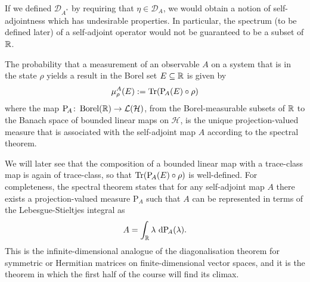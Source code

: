 \begin{remark}
If we defined $\mathcal{D}_{A^*}$ by requiring that $\eta\in \mathcal{D}_{A}$, we would obtain a notion of self-adjointness which has undesirable properties. In particular, the spectrum (to be defined later) of a self-adjoint operator would not be guaranteed to be a subset of $\mathbb{R}$.
\end{remark}

\begin{tcolorbox}[colframe=blue!10!black]
\begin{axiom}[Measurement]
The probability that a measurement of an observable $A$ on a system that is in the state $\rho$ yields a result in the Borel set $E\subseteq \mathbb{R}$ is given by
\begin{equation*}
\mu^A_\rho(E):=\operatorname{Tr}(\mathrm{P}_{\!A}(E)\circ\rho)
\end{equation*}
where the map $\mathrm{P}_{\!A}\colon \operatorname{Borel}(\mathbb{R})\to\mathcal{L}(\mathcal{H})$, from the Borel-measurable subsets of $\mathbb{R}$ to the Banach space of bounded linear maps on $\mathcal{H}$, is the unique projection-valued measure that is associated with the self-adjoint map $A$ according to the spectral theorem.\end{axiom}\end{tcolorbox}

We will later see that the composition of a bounded linear map with a trace-class map is again of trace-class, so that $\operatorname{Tr}(\mathrm{P}_{\!A}(E)\circ\rho)$ is well-defined. For completeness, the spectral theorem states that for any self-adjoint map $A$ there exists a projection-valued measure $\mathrm{P}_{\!A}$ such that $A$ can be represented in terms of the Lebesgue-Stieltjes integral as
\begin{equation*}
A = \int_{\mathbb{R}}\lambda \, \mathop{}\!\mathrm{d} \mathrm{P}_{\!A}(\lambda).
\end{equation*}
This is the infinite-dimensional analogue of the diagonalisation theorem for symmetric or Hermitian matrices on finite-dimensional vector spaces, and it is the theorem in which the first half of the course will find its climax.


